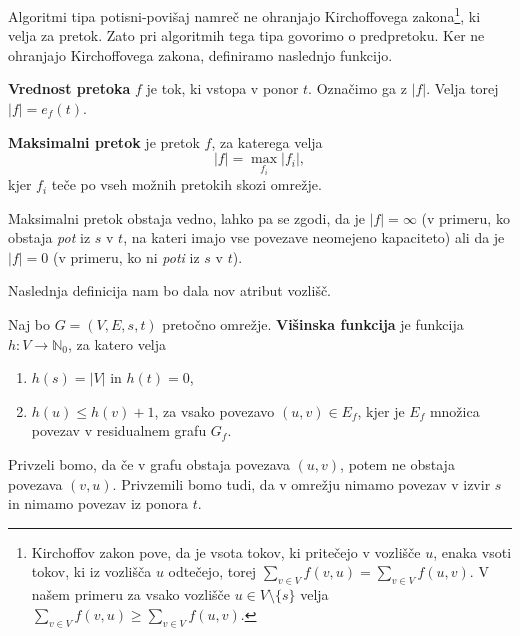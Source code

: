 \documentclass[mat1]{fmfdelo}
\newcommand{\N}{\mathbb N}
\begin{document}
Algoritmi tipa potisni-povišaj namreč ne ohranjajo Kirchoffovega zakona\footnote{Kirchoffov zakon pove, da je vsota tokov, ki pritečejo v vozlišče $u$, enaka vsoti tokov, ki iz vozlišča $u$ odtečejo, torej $\sum_{v\in V} f(v,u) = \sum_{v\in V} f(u,v)$. V našem primeru za vsako vozlišče $u \in V \setminus \{s\}$ velja $\sum_{v\in V} f(v,u) \geq \sum_{v\in V} f(u,v)$.}, ki velja za pretok. Zato pri algoritmih tega tipa govorimo o predpretoku. Ker ne ohranjajo Kirchoffovega zakona, definiramo naslednjo funkcijo.

\begin{definicija}
\textbf{Vrednost pretoka} $f$ je tok, ki vstopa v ponor $t$. Označimo ga z $|f|$. Velja torej $|f| = e_f(t)$.
\end{definicija}

\begin{definicija}
\textbf{Maksimalni pretok} je pretok $f$, za katerega velja \[|f| = \max_{f_i} |f_i|,\] kjer $f_i$ teče po vseh možnih pretokih skozi omrežje.
\end{definicija}

\begin{opomba}
  Maksimalni pretok obstaja vedno, lahko pa se zgodi, da je $|f| = \infty$ (v primeru, ko obstaja \textit{pot} iz $s$ v $t$, na kateri imajo vse povezave neomejeno kapaciteto)
  ali da je $|f| = 0$ (v primeru, ko ni \textit{poti} iz $s$ v $t$).
\end{opomba}

Naslednja definicija nam bo dala nov atribut vozlišč.

\begin{definicija}\label{def:visinska_funkcija}
Naj bo $G=(V,E,s,t)$ pretočno omrežje. \textbf{Višinska funkcija} je funkcija $h\colon V \rightarrow \N_0$, za katero velja
\begin{enumerate}
\item $h(s) = |V|$ in $h(t) = 0$,
\item $h(u) \leq h(v) + 1$, za vsako povezavo $(u,v) \in E_f$, kjer je $E_f$ množica povezav v residualnem grafu $G_f$.
\end{enumerate}
\end{definicija}

\begin{opomba}
Privzeli bomo, da če v grafu obstaja povezava $(u,v)$, potem ne obstaja povezava $(v,u)$. Privzemili bomo tudi, da v omrežju nimamo povezav v izvir $s$ in nimamo povezav iz ponora $t$.
\end{opomba}
\end{document}
